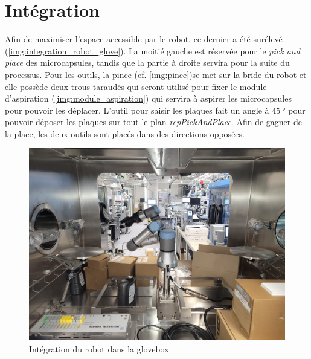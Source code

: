\section{Intégration}
Afin de maximiser l'espace accessible par le robot, ce dernier a été surélevé (\cf \autoref{img:integration_robot_glove}). La moitié gauche est réservée pour le \textit{pick and place} des \glspl{microcapsule}, tandis que la partie à droite servira pour la suite du processus.
Pour les outils, la pince (cf. \autoref{img:pince})se met sur la bride du robot et elle possède deux trous taraudés qui seront utilisé pour fixer le module d'aspiration (\cf \autoref{img:module_aspiration}) qui servira à aspirer les \glspl{microcapsule} pour pouvoir les déplacer.
L'outil pour saisir les plaques fait un angle à $\qty{45}{\degree}$ pour pouvoir déposer les plaques sur tout le plan \textit{repPickAndPlace}. Afin de gagner de la place, les deux outils sont placés dans des directions opposées.
\begin{figure}[ht]
    \centering
    \includegraphics[width = \textwidth]{assets/figures/Hardware/gloveBox.jpeg}
    \caption{Intégration du robot dans la \gls{glovebox}}
    \label{img:integration_robot_glove}
\end{figure}